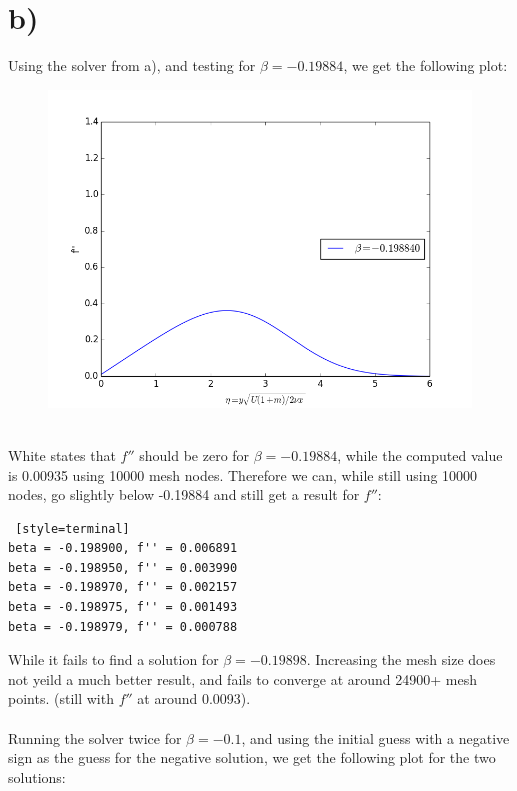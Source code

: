 \documentclass[a4paper,english,11pt,twoside]{article}
\begin{document}
\section*{b)}
Using the solver from a), and testing for $\beta=-0.19884$, we get the following plot:
\\
\begin{figure}[h!]
\includegraphics[scale=0.7]{1b_figure_1.png}
\end{figure}
\\
White states that $f''$ should be zero for  $\beta=-0.19884$, while the computed value is 0.00935 using 10000 mesh nodes. Therefore we can, while still using 10000 nodes, go slightly below -0.19884 and still get a result for $f''$:\\
\begin{lstlisting} [style=terminal]
beta = -0.198900, f'' = 0.006891
beta = -0.198950, f'' = 0.003990
beta = -0.198970, f'' = 0.002157
beta = -0.198975, f'' = 0.001493
beta = -0.198979, f'' = 0.000788
\end{lstlisting}
While it fails to find a solution for $\beta = -0.19898$. Increasing the mesh size does not yeild a much better result, and fails to converge at around  24900+ mesh points. (still with $f''$ at around 0.0093).\\
\\
Running the solver twice for $\beta=-0.1$, and using the initial guess with a negative sign as the guess for the negative solution, we get the following plot for the two solutions:\\
\end{document}
